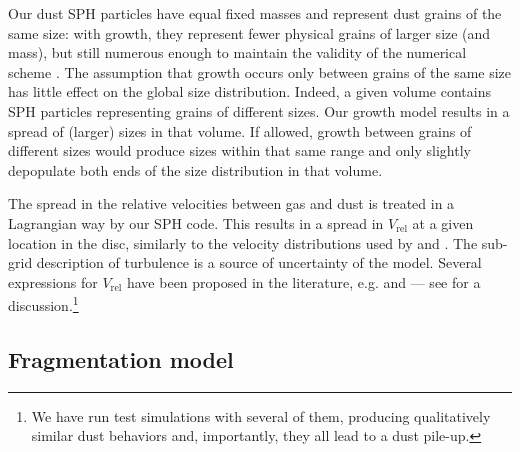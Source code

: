 \documentclass[a4paper,fleqn,usenatbib]{mnras}
\newcommand{\Vrel}{V_\mathrm{rel}}    %
\begin{document}
Our dust SPH particles have equal fixed masses and represent dust grains of the same size: with growth, they represent fewer physical grains of larger size (and mass), but still numerous enough to maintain the validity of the numerical scheme \citep{Laibe2008}. The assumption that growth occurs only between grains of the same size has little effect on the global size distribution. Indeed, a given volume contains SPH particles representing grains of different sizes. Our growth model results in a spread of (larger) sizes in that volume. If allowed, growth between grains of different sizes would produce sizes within that same range and only slightly depopulate both ends of the size distribution in that volume.

The spread in the relative velocities between gas and dust is treated in a Lagrangian way by our SPH code. This results in  a spread in $\Vrel$ at a given location in the disc, similarly to the velocity distributions used by \citet{Windmark2012} and \citet{Garaud2013}. The sub-grid description of turbulence is a source of uncertainty of the model. Several expressions for $\Vrel$ have been proposed in the literature, e.g. \citet{Ormel2007} and \citet{Pan2010} --- see \citet{Laibe2014} for a discussion.\footnote{We have run test simulations with several of them, producing qualitatively similar dust behaviors and, importantly, they all lead to a dust pile-up.}

\subsection{Fragmentation model}
\label{sec:Frag}
\end{document}
